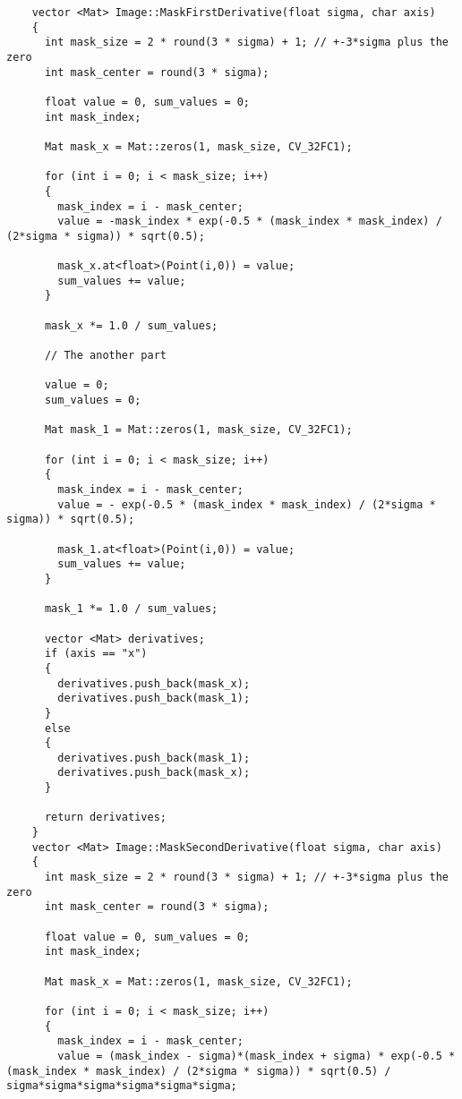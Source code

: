 \documentclass[a4paper, 11pt]{article}
\theoremstyle{definition}
\begin{document}
  \begin{lstlisting}
    vector <Mat> Image::MaskFirstDerivative(float sigma, char axis)
    {
      int mask_size = 2 * round(3 * sigma) + 1; // +-3*sigma plus the zero
      int mask_center = round(3 * sigma);

      float value = 0, sum_values = 0;
      int mask_index;

      Mat mask_x = Mat::zeros(1, mask_size, CV_32FC1);

      for (int i = 0; i < mask_size; i++)
      {
        mask_index = i - mask_center;
        value = -mask_index * exp(-0.5 * (mask_index * mask_index) / (2*sigma * sigma)) * sqrt(0.5);

        mask_x.at<float>(Point(i,0)) = value;
        sum_values += value;
      }

      mask_x *= 1.0 / sum_values;

      // The another part

      value = 0;
      sum_values = 0;

      Mat mask_1 = Mat::zeros(1, mask_size, CV_32FC1);

      for (int i = 0; i < mask_size; i++)
      {
        mask_index = i - mask_center;
        value = - exp(-0.5 * (mask_index * mask_index) / (2*sigma * sigma)) * sqrt(0.5);

        mask_1.at<float>(Point(i,0)) = value;
        sum_values += value;
      }

      mask_1 *= 1.0 / sum_values;

      vector <Mat> derivatives;
      if (axis == "x")
      {
        derivatives.push_back(mask_x);
        derivatives.push_back(mask_1);
      }
      else
      {
        derivatives.push_back(mask_1);
        derivatives.push_back(mask_x);
      }

      return derivatives;
    }
    vector <Mat> Image::MaskSecondDerivative(float sigma, char axis)
    {
      int mask_size = 2 * round(3 * sigma) + 1; // +-3*sigma plus the zero
      int mask_center = round(3 * sigma);

      float value = 0, sum_values = 0;
      int mask_index;

      Mat mask_x = Mat::zeros(1, mask_size, CV_32FC1);

      for (int i = 0; i < mask_size; i++)
      {
        mask_index = i - mask_center;
        value = (mask_index - sigma)*(mask_index + sigma) * exp(-0.5 * (mask_index * mask_index) / (2*sigma * sigma)) * sqrt(0.5) / sigma*sigma*sigma*sigma*sigma*sigma;


\end{lstlisting}
\end{document}
